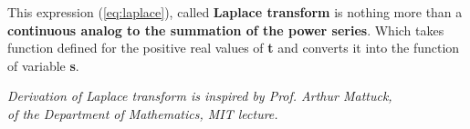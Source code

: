 \documentclass{article}
\begin{document}
\noindent This expression (\ref{eq:laplace}), called \textbf{Laplace transform} is nothing more than a \textbf{continuous analog to the summation of the power series}. Which takes function defined for the positive real values of \textbf{t} and converts it into the function of variable \textbf{s}. 

\vfill 
\begin{center}
\textit{Derivation of Laplace transform is inspired by Prof. Arthur Mattuck,\\ 
of the Department of Mathematics, MIT lecture.}
\end{center}

 
\end{document}
